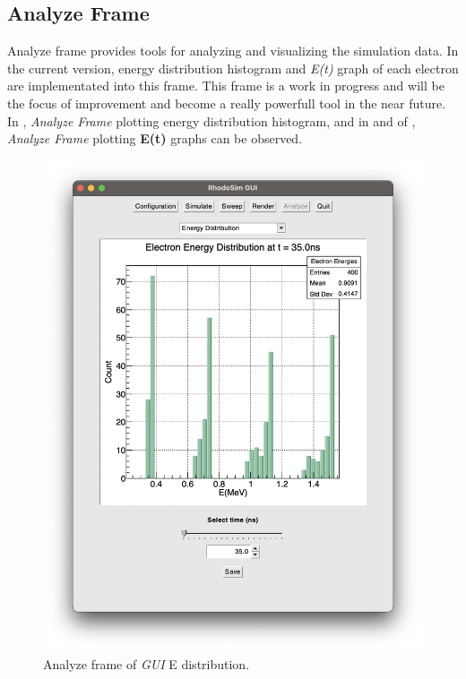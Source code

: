 \documentclass{book}
\begin{document}
\subsection{Analyze Frame}
Analyze frame provides tools for analyzing and visualizing the simulation data. 
In the current version, energy distribution histogram and \textit{E(t)} graph of each electron are implementated into this frame.
This frame is a work in progress and will be the focus of improvement and become a really powerfull tool in the near future.
In , \textit{Analyze Frame} plotting energy distribution histogram, and in  and  of , \textit{Analyze Frame} plotting \textbf{E(t)} graphs can be observed.
\vspace{10pt}
\begin{figure}[h!]
    \centering
    \includegraphics[width=0.8\linewidth]{../../../figures/rhodoSim/GUI_analyze_Edist_2.png}
    \caption{Analyze frame of \textit{GUI} E distribution.}
    \label{fig:gui_analyze_Edist}
\end{figure}
\end{document}
